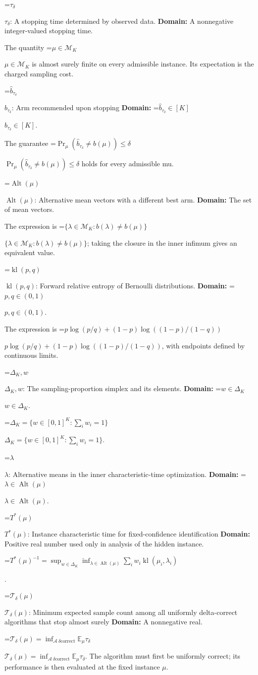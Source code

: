 \documentclass[10pt,a4paper]{article}
\newcommand{\AtlasMath}[1]{\par\begingroup\centering\setbox0=\hbox{$\displaystyle #1$}\ifdim\wd0>1.4\linewidth\typeout{ATLAS WIDE FORMULA: \the\wd0}\fi\ifdim\wd0>\linewidth\resizebox{\linewidth}{!}{\box0}\else\box0\fi\par\endgroup}
\newcommand{\AtlasInlineMath}[1]{\begingroup\setbox0=\hbox{$#1$}\ifdim\wd0>.4\linewidth\endgroup\AtlasMath{#1}\else\endgroup$#1$\fi}
\begin{document}
\AtlasInlineMath{\tau_\delta}: A stopping time determined by observed data. \textbf{Domain:} A nonnegative integer-valued stopping time.

The quantity \AtlasInlineMath{\mu\in\mathcal M_K} is almost surely finite on every admissible instance. Its expectation is the charged sampling cost.

\AtlasInlineMath{\widehat b_{\tau_\delta}}: Arm recommended upon stopping \textbf{Domain:} \AtlasInlineMath{\widehat b_{\tau_\delta}\in[K]}.

The guarantee \AtlasInlineMath{\Pr_\mu(\widehat b_{\tau_\delta}\ne b(\mu))\le\delta} holds for every admissible mu.

\AtlasInlineMath{\operatorname{Alt}(\mu)}: Alternative mean vectors with a different best arm. \textbf{Domain:} The set of mean vectors.

The expression is \AtlasInlineMath{\{\lambda\in\mathcal M_K:b(\lambda)\ne b(\mu)\}}; taking the closure in the inner infimum gives an equivalent value.

\AtlasInlineMath{\operatorname{kl}(p,q)}: Forward relative entropy of Bernoulli distributions. \textbf{Domain:} \AtlasInlineMath{p,q\in(0,1)}.

The expression is \AtlasInlineMath{p\log(p/q)+(1-p)\log((1-p)/(1-q))}, with endpoints defined by continuous limits.

\AtlasInlineMath{\Delta_K,w}: The sampling-proportion simplex and its elements. \textbf{Domain:} \AtlasInlineMath{w\in\Delta_K}.

\AtlasInlineMath{\Delta_K=\{w\in[0,1]^K:\sum_iw_i=1\}}.

\AtlasInlineMath{\lambda}: Alternative means in the inner characteristic-time optimization. \textbf{Domain:} \AtlasInlineMath{\lambda\in\operatorname{Alt}(\mu)}.

\AtlasInlineMath{T^*(\mu)}: Instance characteristic time for fixed-confidence identification \textbf{Domain:} Positive real number used only in analysis of the hidden instance.


\AtlasMath{T^*(\mu)^{-1}=\sup_{w\in\Delta_K}\inf_{\lambda\in\operatorname{Alt}(\mu)}\sum_iw_i\operatorname{kl}(\mu_i,\lambda_i)}
.

\AtlasInlineMath{\mathcal T_\delta(\mu)}: Minimum expected sample count among all uniformly delta-correct algorithms that stop almost surely \textbf{Domain:} A nonnegative real.

\AtlasInlineMath{\mathcal T_\delta(\mu)=\inf_{\mathcal A\ \delta\text{correct}}\mathbb E_\mu\tau_\delta}. The algorithm must first be uniformly correct; its performance is then evaluated at the fixed instance $\mu$.
\end{document}
